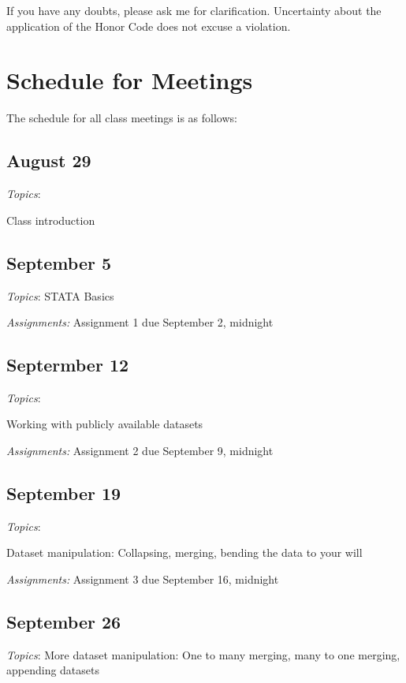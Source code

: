 \documentclass[12pt]{article}
\begin{document}
If you have any doubts, please ask me for clarification. Uncertainty
about the application of the Honor Code does not excuse a violation.

\section{Schedule for Meetings}

The schedule for all class meetings is as follows:

\begin{flushleft}

\subsection{August 29}

\textit{Topics}:

Class introduction

\subsection{September 5}


\textit{Topics}:
STATA Basics

\textit {Assignments:}
Assignment 1 due September 2, midnight

\subsection{Septermber 12}

\textit{Topics}:

Working with publicly available datasets

\textit {Assignments:}
Assignment 2 due September 9, midnight

\subsection{September 19}


\textit{Topics}:

Dataset manipulation: Collapsing, merging, bending the data to your will


\textit {Assignments:}
Assignment 3 due September 16, midnight
\subsection{September 26}


\textit{Topics}:
More dataset manipulation: One to many merging, many to one merging, appending datasets


\end{flushleft}
\end{document}
